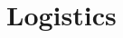 \documentclass[12pt]{amsart}
\numberwithin{equation}{section}
\newcommand{\Q}{\mathbb Q}
\begin{document}
\begin{comment}
Once one has a list of possible conductors, one must find equations of
elliptic curves in each isogeny class.  To do this we use similar
techniques as in Section \ref{sec:ECQrt5}: naive enumeration,
Cremona--Lingham, searching in torsion families, and so on. 
Stein and Gunnells will coordinate on this work.
Once a curve in each
isogeny class is found, work of Billerey \cite{billerey} enables us to
compute representatives for each of the isomorphism classes, just as
for the $\Q(\sqrt{5})$ case.

We propose to work towards the following goals:

\begin{enumerate}
\item Extension of the tables in \cite{complexcubic, neg23} as far as
possible.
\item Extending the computations in \cite{complexcubic, neg23} for other
complex cubic fields. %
Data for elliptic curves over
the fields of discriminants  $-31$, \dots , $-107$ can be found at
\cite{ariah} and in \cite{torsioncubic}.
\item Extend the computations of \cite{complexcubic} to nontrivial
coefficients, i.e.~compile tables of higher weight cuspforms.
\item Incorporate all this data into the \textsf{LMFDB}.
\end{enumerate}






\subsection{Already in intro?}
We propose a workshop in which each day features two talks providing
background information and describing recent work and current problems
of interest.  Each afternoon will involve group work in which
the participants are actively engaged in a variety of activities related
to the workshop focus.  Those activities will include starting or
continuing research projects, going through the details of advanced
material which was not covered in the lectures, and working to put
new material into the $L$-functions and Modular Forms Database 

\end{comment}


\section{Logistics}
\end{document}
